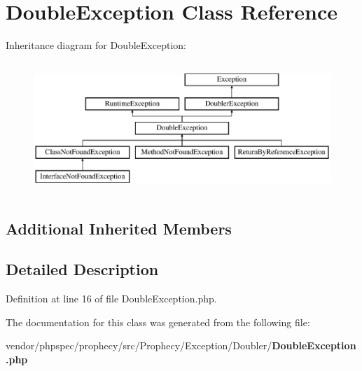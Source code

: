\section{Double\+Exception Class Reference}
\label{class_prophecy_1_1_exception_1_1_doubler_1_1_double_exception}
Inheritance diagram for Double\+Exception\+:\begin{figure}[H]
\begin{center}
\leavevmode
\includegraphics[height=5.000000cm]{class_prophecy_1_1_exception_1_1_doubler_1_1_double_exception}
\end{center}
\end{figure}
\subsection*{Additional Inherited Members}


\subsection{Detailed Description}


Definition at line 16 of file Double\+Exception.\+php.



The documentation for this class was generated from the following file\+:\begin{DoxyCompactItemize}
\item 
vendor/phpspec/prophecy/src/\+Prophecy/\+Exception/\+Doubler/{\bf Double\+Exception.\+php}\end{DoxyCompactItemize}
